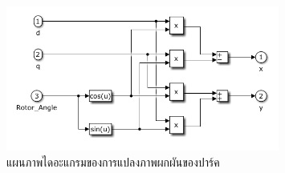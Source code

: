 \documentclass[11pt,a4paper]{article}
\begin{document}
\begin{figure}[H]
    \centering
    \includegraphics[width=0.8\textwidth]{park_inverse_trans.png}
    \caption{แผนภาพไดอะแกรมของการแปลงภาพผกผันของปาร์ค}
\end{figure}
\end{document}
